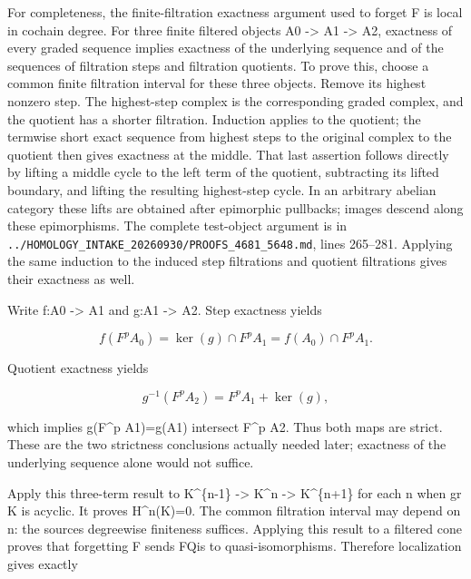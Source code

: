 \documentclass[11pt]{article}
\begin{document}
For completeness,\allowbreak{} the finite-filtration exactness argument used to forget F is local in cochain degree. For three finite filtered objects A0 \allowbreak{}-> A1 \allowbreak{}-> A2,\allowbreak{} exactness of every graded sequence implies exactness of the underlying sequence and of the sequences of filtration steps and filtration quotients. To prove this,\allowbreak{} choose a common finite filtration interval for these three objects. Remove its highest nonzero step. The highest-step complex is the corresponding graded complex,\allowbreak{} and the quotient has a shorter filtration. Induction applies to the quotient; the termwise short exact sequence from highest steps to the original complex to the quotient then gives exactness at the middle. That last assertion follows directly by lifting a middle cycle to the left term of the quotient,\allowbreak{} subtracting its lifted boundary,\allowbreak{} and lifting the resulting highest-step cycle. In an arbitrary abelian category these lifts are obtained after epimorphic pullbacks; images descend along these epimorphisms. The complete test-object argument is in \texttt{.\allowbreak{}.\allowbreak{}/\allowbreak{}HOMOLOGY\_\allowbreak{}INTAKE\_\allowbreak{}20260930/\allowbreak{}PROOFS\_\allowbreak{}4681\_\allowbreak{}5648.\allowbreak{}md},\allowbreak{} lines 265–\allowbreak{}281. Applying the same induction to the induced step filtrations and quotient filtrations gives their exactness as well.

Write f:\allowbreak{}A0 \allowbreak{}-> A1 and g:\allowbreak{}A1 \allowbreak{}-> A2. Step exactness yields

\[
 f(F^p A_0)=\ker(g)\cap F^p A_1=f(A_0)\cap F^p A_1.
\]

Quotient exactness yields

\[
 g^{-1}(F^p A_2)=F^p A_1+\ker(g),
\]

which implies g(F\^{}p A1)\allowbreak{}\allowbreak{}=g(A1)\allowbreak{} intersect F\^{}p A2. Thus both maps are strict. These are the two strictness conclusions actually needed later; exactness of the underlying sequence alone would not suffice.

Apply this three-term result to K\^{}\{n-1\} \allowbreak{}-> K\^{}n \allowbreak{}-> K\textasciicircum{}\{n\allowbreak{}+1\} for each n when gr K is acyclic. It proves H\textasciicircum{}n(K)\allowbreak{}\allowbreak{}=0. The common filtration interval may depend on n:\allowbreak{} the source\textquotesingle s degreewise finiteness suffices. Applying this result to a filtered cone proves that forgetting F sends FQis to quasi-isomorphisms. Therefore localization gives exactly
\end{document}
